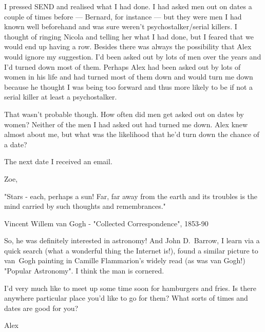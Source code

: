 I pressed {\twelvess SEND\/} and realised what I had done. I had
asked men out on dates a couple of times before --- Bernard, for
instance --- but they were men I had known well beforehand and was
sure weren't psychostalker/serial killers. I thought of ringing
Nicola and telling her what I had done, but I feared that we would
end up having a row. Besides there was always the possibility that
Alex would ignore my suggestion. I'd been asked out by lots of men
over the years and I'd turned down most of them. Perhaps Alex had been
asked out by lots of women in his life and had turned most of them
down and would turn me down because he thought I was being too
forward and thus more likely to be if not a serial killer at least a
psychostalker.

That wasn't probable though. How often did men get asked out on
dates by women? Neither of the men I had asked out had turned me
down. Alex knew almost about me, but what was the likelihood that he'd turn down the chance of a date?

The next date I received an email.

{\twelvett\obeylines Zoe,

"Stars - each, perhaps a sun! Far, far away from the earth and its
troubles is the mind carried by such thoughts and remembrances."

Vincent Willem van Gogh - "Collected Correspondence", 1853-90

So, he was definitely interested in astronomy! And John D.~Barrow, I
learn via a quick search (what a wonderful thing the Internet is!), found a
similar picture to van~Gogh painting in Camille Flammarion's widely
read (as was van Gogh!) "Popular Astronomy". I think the man is
cornered.

I'd very much like to meet up some time soon for hamburgers and
fries. Is there anywhere particular place you'd like to go for them?
What sorts of times and dates are good for you?

Alex}

